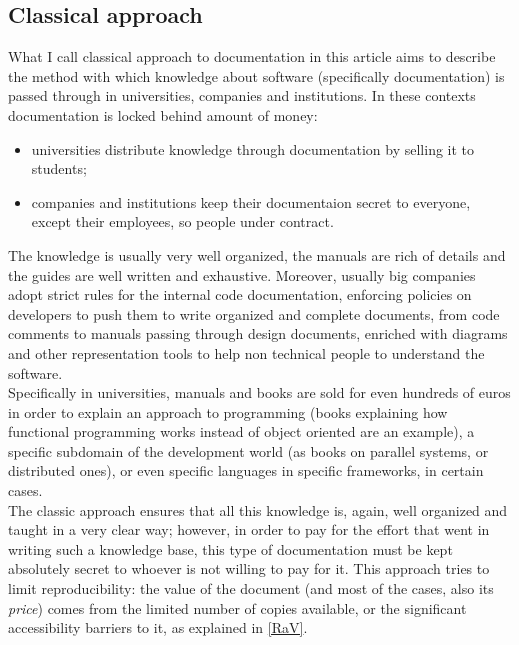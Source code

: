\documentclass{article}
\begin{document}
		\subsection{Classical approach}
			What I call classical approach to documentation in this article aims to describe the method with which knowledge about software (specifically documentation) is passed through in universities, companies and institutions. In these contexts documentation is locked behind amount of money:
			\begin{itemize}
				\item universities distribute knowledge through documentation by selling it to students;
				\item companies and institutions keep their documentaion secret to everyone, except their employees, so people under contract.
			\end{itemize}
			The knowledge is usually very well organized, the manuals are rich of details and the guides are well written and exhaustive. Moreover, usually big companies adopt strict rules for the internal code documentation, enforcing policies on developers to push them to write organized and complete documents, from code comments to manuals passing through design documents, enriched with diagrams and other representation tools to help non technical people to understand the software.\\
			Specifically in universities, manuals and books are sold for even hundreds of euros in order to explain an approach to programming (books explaining how functional programming works instead of object oriented are an example), a specific subdomain of the development world (as books on parallel systems, or distributed ones), or even specific languages in specific frameworks, in certain cases.\\
			The classic approach ensures that all this knowledge is, again, well organized and taught in a very clear way; however, in order to pay for the effort that went in writing such a knowledge base, this type of documentation must be kept absolutely secret to whoever is not willing to pay for it. This approach tries to limit reproducibility: the value of the document (and most of the cases, also its \textit{price}) comes from the limited number of copies available, or the significant accessibility barriers to it, as explained in \ref{RaV}. 
\end{document}
